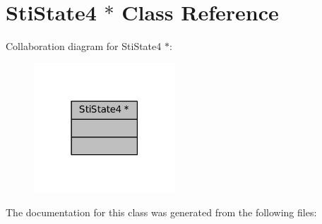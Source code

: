 \hypertarget{classStiState4_01_5}{}\section{Sti\+State4 $\ast$ Class Reference}
\label{classStiState4_01_5}


Collaboration diagram for Sti\+State4 $\ast$\+:
\nopagebreak
\begin{figure}[H]
\begin{center}
\leavevmode
\includegraphics[width=150pt]{classStiState4_01_5__coll__graph}
\end{center}
\end{figure}


The documentation for this class was generated from the following files\+: